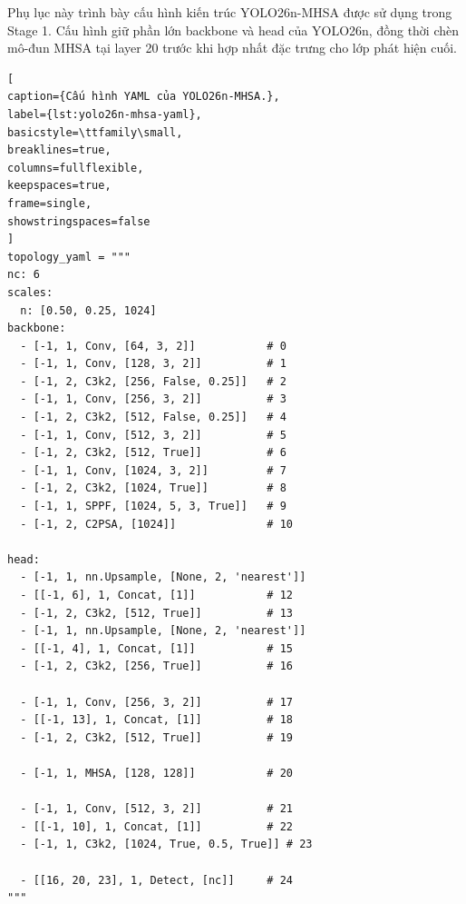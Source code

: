 Phụ lục này trình bày cấu hình kiến trúc YOLO26n-MHSA được sử dụng trong Stage 1. Cấu hình giữ phần lớn backbone và head của YOLO26n, đồng thời chèn mô-đun MHSA tại layer 20 trước khi hợp nhất đặc trưng cho lớp phát hiện cuối.

\renewcommand{\lstlistingname}{Đoạn mã}
\begin{lstlisting}[
caption={Cấu hình YAML của YOLO26n-MHSA.},
label={lst:yolo26n-mhsa-yaml},
basicstyle=\ttfamily\small,
breaklines=true,
columns=fullflexible,
keepspaces=true,
frame=single,
showstringspaces=false
]
topology_yaml = """
nc: 6 
scales:
  n: [0.50, 0.25, 1024]
backbone:
  - [-1, 1, Conv, [64, 3, 2]]           # 0
  - [-1, 1, Conv, [128, 3, 2]]          # 1
  - [-1, 2, C3k2, [256, False, 0.25]]   # 2
  - [-1, 1, Conv, [256, 3, 2]]          # 3
  - [-1, 2, C3k2, [512, False, 0.25]]   # 4  
  - [-1, 1, Conv, [512, 3, 2]]          # 5
  - [-1, 2, C3k2, [512, True]]          # 6  
  - [-1, 1, Conv, [1024, 3, 2]]         # 7
  - [-1, 2, C3k2, [1024, True]]         # 8
  - [-1, 1, SPPF, [1024, 5, 3, True]]   # 9
  - [-1, 2, C2PSA, [1024]]              # 10 

head:
  - [-1, 1, nn.Upsample, [None, 2, 'nearest']]
  - [[-1, 6], 1, Concat, [1]]           # 12
  - [-1, 2, C3k2, [512, True]]          # 13 
  - [-1, 1, nn.Upsample, [None, 2, 'nearest']]
  - [[-1, 4], 1, Concat, [1]]           # 15
  - [-1, 2, C3k2, [256, True]]          # 16 
  
  - [-1, 1, Conv, [256, 3, 2]]          # 17
  - [[-1, 13], 1, Concat, [1]]          # 18
  - [-1, 2, C3k2, [512, True]]          # 19
  
  - [-1, 1, MHSA, [128, 128]]           # 20 
  
  - [-1, 1, Conv, [512, 3, 2]]          # 21
  - [[-1, 10], 1, Concat, [1]]          # 22
  - [-1, 1, C3k2, [1024, True, 0.5, True]] # 23
  
  - [[16, 20, 23], 1, Detect, [nc]]     # 24
"""
\end{lstlisting}